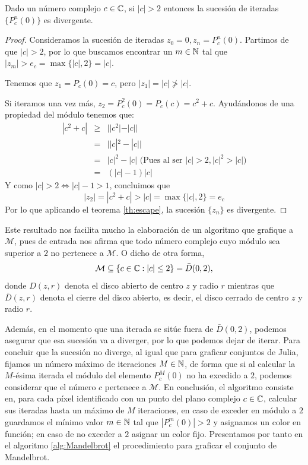 \begin{proposicion}
  \label{prop:mandelbrot-escape}
  Dado un número complejo $c\in\mathbb{C}$, si $|c|>2$ entonces la sucesión de iteradas $\{P_c^n(0)\}$ es divergente.
\end{proposicion}
\begin{proof}
  Consideramos la sucesión de iteradas $z_0 = 0, z_n=P_c^n(0)$. Partimos de que $|c|>2$, por lo que buscamos encontrar un $m\in\mathbb{N}$ tal que $|z_m|>e_c=\max\{|c|,2\}=|c|$.
  
  Tenemos que $z_1=P_c(0)=c$, pero $|z_1|=|c|\not>|c|$.
  
  Si iteramos una vez más, $z_2=P_c^2(0)=P_c(c)=c^2+c$. Ayudándonos de una propiedad del módulo tenemos que:
  \begin{eqnarray*}
    |c^2+c| & \geq & ||c^2|-|c|| \\
            & = & ||c|^2 -|c|| \\
            & = & |c|^2-|c| \text{ (Pues al ser } |c|>2, |c|^2>|c|) \\
            & = & (|c|-1)|c| 
  \end{eqnarray*}
  Y como $|c|>2\Leftrightarrow |c|-1>1$, concluimos que
  $$
  |z_2|=|c^2+c| > |c| = \max\{|c|,2\} = e_c
  $$
  Por lo que aplicando el teorema \ref{th:escape}, la sucesión $\{z_n\}$ es divergente.
\end{proof}

Este resultado nos facilita mucho la elaboración de un algoritmo que grafique a $\mathcal{M}$, pues de entrada nos afirma que todo número complejo cuyo módulo sea superior a $2$ no pertenece a $\mathcal M$. O dicho de otra forma, 
$$
\mathcal{M}\subseteq \{c\in\mathbb{C}: |c|\leq 2\} = \bar D(0,2),
$$
donde $D(z,r)$ denota el disco abierto de centro $z$ y radio $r$ mientras que $\bar D(z,r)$ denota el cierre del disco abierto, es decir, el disco cerrado de centro $z$ y radio $r$.

Además, en el momento que una iterada se sitúe fuera de $\bar D(0,2)$, podemos asegurar que esa sucesión va a diverger, por lo que podemos dejar de iterar. Para concluir que la sucesión no diverge, al igual que para graficar conjuntos de Julia, fijamos un número máximo de iteraciones $M\in\mathbb{N}$, de forma que si al calcular la $M$-ésima iterada el módulo del elemento $P_c^{M}(0)$ no ha excedido a $2$, podemos considerar que el número $c$ pertenece a $\mathcal{M}$. En conclusión, el algoritmo consiste en, para cada píxel identificado con un punto del plano complejo $c\in\mathbb{C}$, calcular sus iteradas hasta un máximo de $M$ iteraciones, en caso de exceder en módulo a $2$ guardamos el mínimo valor $m\in\mathbb{N}$ tal que $|P_c^m(0)|>2$ y asignamos un color en función; en caso de no exceder a $2$ asignar un color fijo. Presentamos por tanto en el algoritmo \ref{alg:Mandelbrot} el procedimiento para graficar el conjunto de Mandelbrot. 

